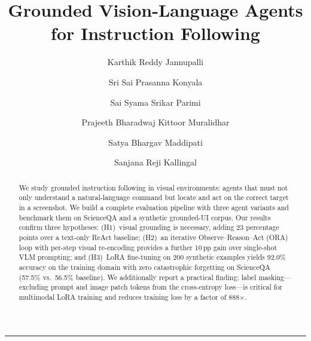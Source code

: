\documentclass[10pt,twocolumn]{article}
\begin{document}
\title{\textbf{Grounded Vision-Language Agents\\for Instruction Following}}

\author[1]{Karthik Reddy Jannupalli}
\author[2]{Sri Sai Prasanna Konyala}
\author[3]{Sai Syama Srikar Parimi}
\author[4]{Prajeeth Bharadwaj Kittoor Muralidhar}
\author[5]{Satya Bhargav Maddipati}
\author[6]{Sanjana Reji Kallingal}


\date{}
\maketitle
\thispagestyle{empty}

\begin{abstract}
\noindent
We study grounded instruction following in visual environments: agents that must not only
understand a natural-language command but locate and act on the correct target in a screenshot.
We build a complete evaluation pipeline with three agent variants and benchmark them on
ScienceQA and a synthetic grounded-UI corpus. Our results confirm three hypotheses:
(H1)~visual grounding is necessary, adding 23 percentage points over a text-only ReAct
baseline; (H2)~an iterative Observe--Reason--Act (ORA) loop with per-step visual re-encoding
provides a further 10\,pp gain over single-shot VLM prompting; and (H3)~LoRA fine-tuning on
200 synthetic examples yields 92.0\% accuracy on the training domain with zero catastrophic
forgetting on ScienceQA (57.5\% vs.\ 56.5\% baseline). We additionally report a practical
finding: label masking---excluding prompt and image patch tokens from the cross-entropy
loss---is critical for multimodal LoRA training and reduces training loss by a factor of 888$\times$.
\end{abstract}

\vspace{-4pt}
\noindent\rule{\linewidth}{0.4pt}
\vspace{2pt}
\end{document}
